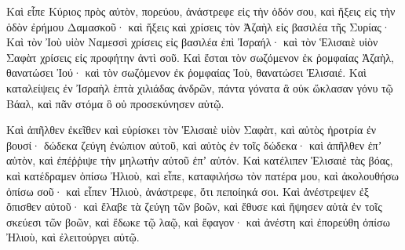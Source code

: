 {Καὶ εἶπε Κύριος πρὸς αὐτὸν, πορεύου, ἀνάστρεφε εἰς τὴν ὁδόν σου, καὶ ἥξεις εἰς τὴν ὁδὸν ἐρήμου Δαμασκοῦ· καὶ ἥξεις καὶ χρίσεις τὸν Ἀζαὴλ εἰς βασιλέα τῆς Συρίας·
Καὶ τὸν Ἰοὺ υἱὸν Ναμεσσὶ χρίσεις εἰς βασιλέα ἐπὶ Ἰσραήλ· καὶ τὸν Ἑλισαιὲ υἱὸν Σαφὰτ χρίσεις εἰς προφήτην ἀντὶ σοῦ.
Καὶ ἔσται τὸν σωζόμενον ἐκ ῥομφαίας Ἀζαὴλ, θανατώσει Ἰού· καὶ τὸν σωζόμενον ἐκ ῥομφαίας Ἰοὺ, θανατώσει Ἑλισαιέ.
Καὶ καταλείψεις ἐν Ἰσραὴλ ἑπτὰ χιλιάδας ἀνδρῶν, πάντα γόνατα ἃ οὐκ ὤκλασαν γόνυ τῷ Βάαλ, καὶ πᾶν στόμα ὃ οὐ προσεκύνησεν αὐτῷ.
\par }{\PP {}Καὶ ἀπῆλθεν ἐκεῖθεν καὶ εὑρίσκει τὸν Ἑλισαιὲ υἱὸν Σαφὰτ, καὶ αὐτὸς ἠροτρία ἐν βουσί· δώδεκα ζεύγη ἐνώπιον αὐτοῦ, καὶ αὐτὸς ἐν τοῖς δώδεκα· καὶ ἀπῆλθεν ἐπʼ αὐτὸν, καὶ ἐπέῥῥιψε τὴν μηλωτὴν αὐτοῦ ἐπʼ αὐτόν.
Καὶ κατέλιπεν Ἑλισαιὲ τὰς βόας, καὶ κατέδραμεν ὀπίσω Ἠλιοὺ, καὶ εἶπε, καταφιλήσω τὸν πατέρα μου, καὶ ἀκολουθήσω ὀπίσω σοῦ· καὶ εἶπεν Ἠλιοὺ, ἀνάστρεφε, ὅτι πεποίηκά σοι.
Καὶ ἀνέστρεψεν ἐξ ὄπισθεν αὐτοῦ· καὶ ἔλαβε τὰ ζεύγη τῶν βοῶν, καὶ ἔθυσε καὶ ἥψησεν αὐτὰ ἐν τοῖς σκεύεσι τῶν βοῶν, καὶ ἔδωκε τῷ λαῷ, καὶ ἔφαγον· καὶ ἀνέστη καὶ ἐπορεύθη ὀπίσω Ἠλιοὺ, καὶ ἐλειτούργει αὐτῷ.

}
